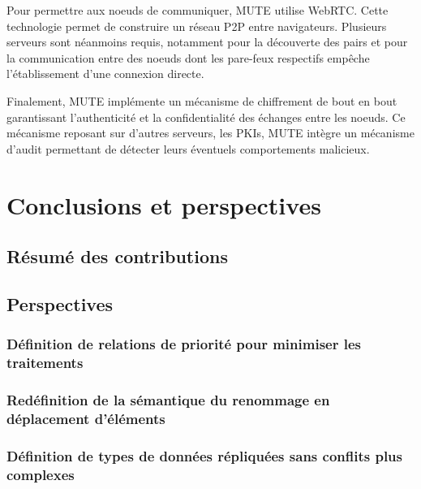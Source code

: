 \documentclass[12pt]{thesul}
\newcommand{\lepoch}{$<_{\varepsilon}$~}
\begin{document}
Pour permettre aux noeuds de communiquer, MUTE utilise WebRTC.
Cette technologie permet de construire un réseau \ac{P2P} entre navigateurs.
Plusieurs serveurs sont néanmoins requis, notamment pour la découverte des pairs et pour la communication entre des noeuds dont les pare-feux respectifs empêche l'établissement d'une connexion directe.

Finalement, MUTE implémente un mécanisme de chiffrement de bout en bout garantissant l'authenticité et la confidentialité des échanges entre les noeuds.
Ce mécanisme reposant sur d'autres serveurs, les PKIs, MUTE intègre un mécanisme d'audit permettant de détecter leurs éventuels comportements malicieux.


\NumberThisInToc
\chapter{Conclusions et perspectives}
\minitoc
\section{Résumé des contributions}
\section{Perspectives}


\subsection{Définition de relations de priorité pour minimiser les traitements}
\subsection{Redéfinition de la sémantique du renommage en déplacement d'éléments}
\subsection{Définition de types de données répliquées sans conflits plus complexes}
\end{document}
